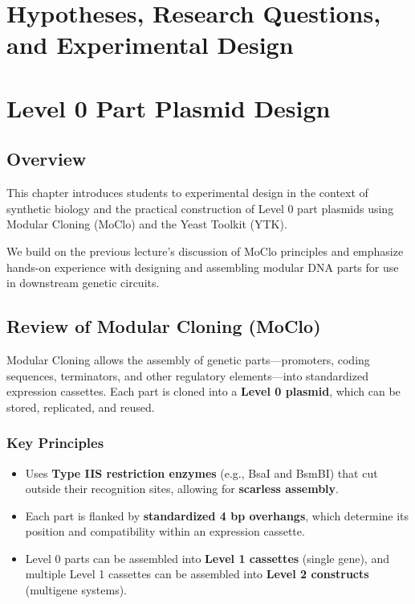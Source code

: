 \documentclass[
  letterpaper,
  DIV=11,
  numbers=noendperiod]{scrreprt}
\providecommand{\tightlist}{%
  \setlength{\itemsep}{0pt}\setlength{\parskip}{0pt}}\usepackage{longtable,booktabs,array}
\begin{document}

\chapter{Hypotheses, Research Questions, and Experimental
Design}\label{hypotheses-research-questions-and-experimental-design}


\chapter{Level 0 Part Plasmid Design}\label{level-0-part-plasmid-design}

\section{Overview}\label{overview}

This chapter introduces students to experimental design in the context
of synthetic biology and the practical construction of Level 0 part
plasmids using Modular Cloning (MoClo) and the Yeast Toolkit (YTK).

We build on the previous lecture's discussion of MoClo principles and
emphasize hands-on experience with designing and assembling modular DNA
parts for use in downstream genetic circuits.

\section{Review of Modular Cloning
(MoClo)}\label{review-of-modular-cloning-moclo}

Modular Cloning allows the assembly of genetic parts---promoters, coding
sequences, terminators, and other regulatory elements---into
standardized expression cassettes. Each part is cloned into a
\textbf{Level 0 plasmid}, which can be stored, replicated, and reused.

\subsection{Key Principles}\label{key-principles}

\begin{itemize}
\tightlist
\item
  Uses \textbf{Type IIS restriction enzymes} (e.g., BsaI and BsmBI) that
  cut outside their recognition sites, allowing for \textbf{scarless
  assembly}.
\item
  Each part is flanked by \textbf{standardized 4 bp overhangs}, which
  determine its position and compatibility within an expression
  cassette.
\item
  Level 0 parts can be assembled into \textbf{Level 1 cassettes} (single
  gene), and multiple Level 1 cassettes can be assembled into
  \textbf{Level 2 constructs} (multigene systems).
\end{itemize}
\end{document}
